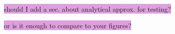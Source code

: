 \documentclass{aa}
\numberwithin{equation}{section}
\numberwithin{table}{section}
\numberwithin{figure}{section}
\begin{document}
\colorbox{Plum}{should I add a sec. about analytical approx. for testing?}

\colorbox{Plum}{or is it enough to compare to your figures?}



\end{document}
